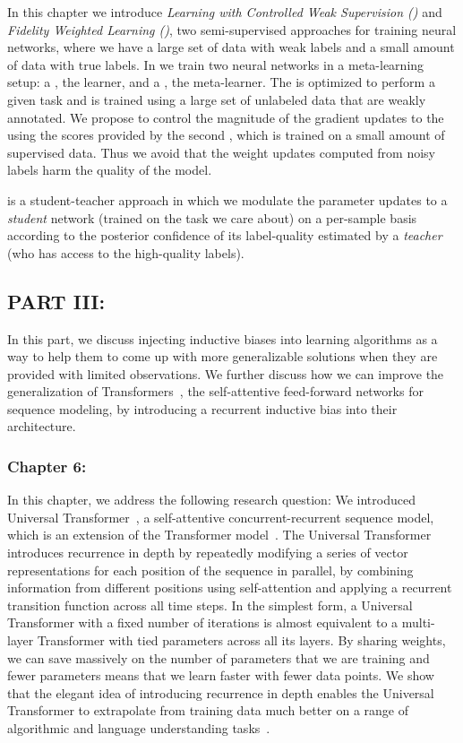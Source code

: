In this chapter we introduce \emph{Learning with Controlled Weak Supervision (\cws)} and \emph{Fidelity Weighted Learning (\fwl)}, two semi-supervised approaches for training neural networks, where we have a large set of data with weak labels and a small amount of data with true labels. 
%
In \cws we train two neural networks in a meta-learning setup: a \tnet, the learner, and a \cnet, the meta-learner.  The \tnet is optimized to perform a given task and is trained using a large set of unlabeled data that are weakly annotated. We propose to control the magnitude of the gradient updates to the \tnet using the scores provided by the second \cnet, which is trained on a small amount of supervised data. Thus we avoid that the weight updates computed from noisy labels harm the quality of the \tnet model.

\fwl is a student-teacher approach in which we modulate the parameter updates to a \emph{student} network (trained on the task we care about) on a per-sample basis according to the posterior confidence of its label-quality estimated by a \emph{teacher} (who has access to the high-quality labels).  

\subsection*{PART III: }
In this part, we discuss injecting inductive biases into learning algorithms as a way to help them to come up with more generalizable solutions when they are provided with limited observations. We further discuss how we can improve the generalization of Transformers~\citep{transformer}, the self-attentive feed-forward networks for sequence modeling, by introducing a recurrent inductive bias into their architecture.

\subsubsection*{Chapter 6: }
In this chapter, we address the following research question:
We introduced Universal Transformer~\citep{Dehghani:ICLR:2019}, a self-attentive concurrent-recurrent sequence model, which is an extension of the Transformer model~\citep{vaswani2017attention}. The Universal Transformer introduces recurrence in depth by repeatedly modifying a series of vector representations for each position of the sequence in parallel, by combining information from different positions using self-attention and applying a recurrent transition function across all time steps. 
In the simplest form, a Universal Transformer with a fixed number of iterations is almost equivalent to a multi-layer Transformer with tied parameters across all its layers. By sharing weights, we can save massively on the number of parameters that we are training and fewer parameters means that we learn faster with fewer data points.  We show that the elegant idea of introducing recurrence in depth enables the Universal Transformer to extrapolate from training data much better on a range of algorithmic and language understanding tasks~\citep{Dehghani:ICLR:2019, Dehghani:2019:WSDM}.

